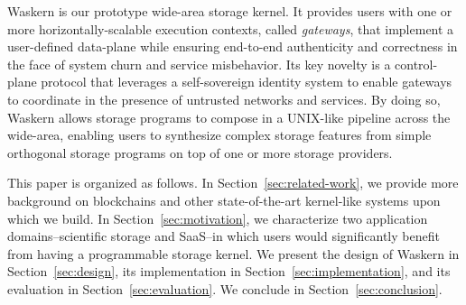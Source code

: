 Waskern is our prototype wide-area storage kernel.  It provides 
users with one or more horizontally-scalable execution contexts, called
\textit{gateways}, that implement a user-defined data-plane while ensuring
end-to-end authenticity and correctness in the face of system churn and service
misbehavior.  Its key novelty is a control-plane protocol
that leverages a self-sovereign identity system to enable gateways to coordinate in
the presence of untrusted networks and services.  By doing so, Waskern allows
storage programs to compose in a UNIX-like pipeline across the wide-area,
enabling users to synthesize complex storage features from simple
orthogonal storage programs on top of one or more storage providers.

This paper is organized as follows.  In Section~\ref{sec:related-work}, we
provide more background on blockchains and other state-of-the-art kernel-like systems upon
which we build.  In Section~\ref{sec:motivation}, we characterize two
application domains--scientific storage and SaaS--in which users would
significantly benefit from having a programmable storage kernel.  We present the
design of Waskern in Section~\ref{sec:design}, its implementation in
Section~\ref{sec:implementation}, and its evaluation in
Section~\ref{sec:evaluation}.  We conclude in Section~\ref{sec:conclusion}.
